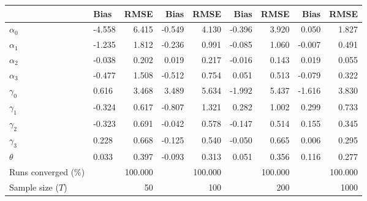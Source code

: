 
\begin{tabular}[t]{llrrrrrrr}
\toprule
  & Bias & RMSE & Bias & RMSE & Bias & RMSE & Bias & RMSE\\
\midrule
$\alpha_{0}$ & -4.558 & 6.415 & -0.549 & 4.130 & -0.396 & 3.920 & 0.050 & 1.827\\
$\alpha_{1}$ & -1.235 & 1.812 & -0.236 & 0.991 & -0.085 & 1.060 & -0.007 & 0.491\\
$\alpha_{2}$ & -0.038 & 0.202 & 0.019 & 0.217 & -0.016 & 0.143 & 0.019 & 0.055\\
$\alpha_{3}$ & -0.477 & 1.508 & -0.512 & 0.754 & 0.051 & 0.513 & -0.079 & 0.322\\
$\gamma_{0}$ & 0.616 & 3.468 & 3.489 & 5.634 & -1.992 & 5.437 & -1.616 & 3.830\\
$\gamma_{1}$ & -0.324 & 0.617 & -0.807 & 1.321 & 0.282 & 1.002 & 0.299 & 0.733\\
$\gamma_{2}$ & -0.323 & 0.691 & -0.042 & 0.578 & -0.147 & 0.514 & 0.155 & 0.345\\
$\gamma_{3}$ & 0.228 & 0.668 & -0.125 & 0.540 & -0.050 & 0.665 & 0.006 & 0.295\\
$\theta$ & 0.033 & 0.397 & -0.093 & 0.313 & 0.051 & 0.356 & 0.116 & 0.277\\
Runs converged (\%) &  & 100.000 &  & 100.000 &  & 100.000 &  & 100.000\\
Sample size ($T$) &  & 50 &  & 100 &  & 200 &  & 1000\\
\bottomrule
\end{tabular}
